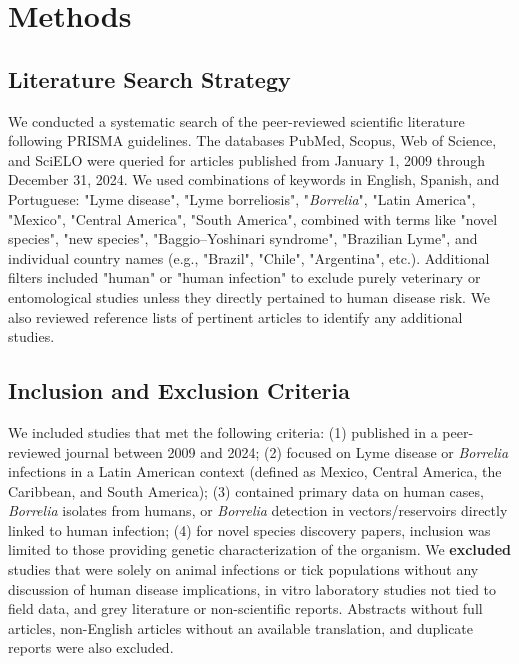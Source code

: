 \documentclass[11pt,letterpaper]{article}
\begin{document}
\section{Methods}
\subsection{Literature Search Strategy}
We conducted a systematic search of the peer-reviewed scientific literature following PRISMA guidelines. The databases PubMed, Scopus, Web of Science, and SciELO were queried for articles published from January 1, 2009 through December 31, 2024. We used combinations of keywords in English, Spanish, and Portuguese: "Lyme disease", "Lyme borreliosis", "\textit{Borrelia}", "Latin America", "Mexico", "Central America", "South America", combined with terms like "novel species", "new species", "Baggio–Yoshinari syndrome", "Brazilian Lyme", and individual country names (e.g., "Brazil", "Chile", "Argentina", etc.). Additional filters included "human" or "human infection" to exclude purely veterinary or entomological studies unless they directly pertained to human disease risk. We also reviewed reference lists of pertinent articles to identify any additional studies.

\subsection{Inclusion and Exclusion Criteria}
We included studies that met the following criteria: (1) published in a peer-reviewed journal between 2009 and 2024; (2) focused on Lyme disease or \textit{Borrelia} infections in a Latin American context (defined as Mexico, Central America, the Caribbean, and South America); (3) contained primary data on human cases, \textit{Borrelia} isolates from humans, or \textit{Borrelia} detection in vectors/reservoirs directly linked to human infection; (4) for novel species discovery papers, inclusion was limited to those providing genetic characterization of the organism. We \textbf{excluded} studies that were solely on animal infections or tick populations without any discussion of human disease implications, in vitro laboratory studies not tied to field data, and grey literature or non-scientific reports. Abstracts without full articles, non-English articles without an available translation, and duplicate reports were also excluded.
\end{document}

